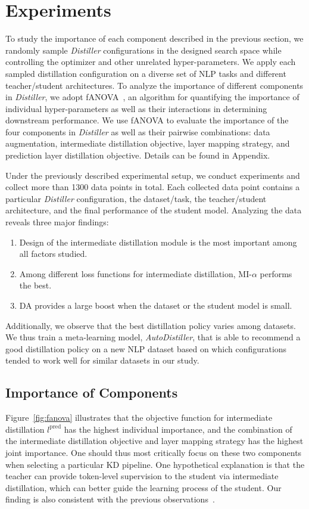 \documentclass[11pt]{article}
\begin{document}
\section{Experiments}
\label{sec:experiments}
To study the importance of each component described in the previous section, we randomly sample \emph{Distiller} configurations in the designed search space while controlling the optimizer and other unrelated hyper-parameters. We apply each sampled distillation configuration on a diverse set of NLP tasks and different teacher/student architectures. To analyze the importance of different components in \emph{Distiller}, we adopt fANOVA~\citep{hutter2014efficient}, an algorithm for quantifying the importance of individual hyper-parameters as well as their interactions in determining downstream performance. We use fANOVA to evaluate the importance of the four components in \emph{Distiller} as well as their pairwise combinations: data augmentation, intermediate distillation objective, layer mapping strategy, and prediction layer distillation objective. Details can be found in Appendix.


Under the previously described experimental setup, we conduct experiments and collect more than 1300 data points in total. Each collected data point contains a particular \emph{Distiller} configuration, the dataset/task, the teacher/student architecture, and the final performance of the student model. Analyzing the data reveals three major findings:

\begin{enumerate}
    \item Design of the intermediate distillation module is the most important among all factors studied.
    \item Among different loss functions for intermediate distillation, MI-$\alpha$ performs the best.
    \item DA provides a large boost when the dataset or the student model is small.
\end{enumerate}
Additionally, we observe that the best distillation policy varies among datasets. We thus train a meta-learning model, \emph{AutoDistiller}, that is able to recommend a good distillation policy on a new NLP dataset based on which configurations tended to work well for similar datasets in our study.

\subsection{Importance of Components}
 Figure~\ref{fig:fanova} illustrates that the objective function for intermediate distillation $l^{\text{pred}}$ has the highest individual importance, and the combination of the intermediate distillation objective and layer mapping strategy has the highest joint importance. One should thus most critically focus on these two components when selecting a particular KD pipeline. One hypothetical explanation is that the teacher can provide token-level supervision to the student via intermediate distillation, which can better guide the learning process of the student. Our finding is also consistent with the previous observations~\citep{sun2019patient,li2020bert}.
 
\end{document}
